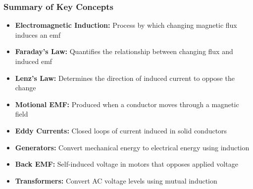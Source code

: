 \documentclass{beamer}
\begin{document}
\begin{frame}
\frametitle{Summary of Key Concepts}
\begin{itemize}
\item \textbf{Electromagnetic Induction:} Process by which changing magnetic flux induces an emf
\item \textbf{Faraday's Law:} Quantifies the relationship between changing flux and induced emf
\item \textbf{Lenz's Law:} Determines the direction of induced current to oppose the change
\item \textbf{Motional EMF:} Produced when a conductor moves through a magnetic field
\item \textbf{Eddy Currents:} Closed loops of current induced in solid conductors
\item \textbf{Generators:} Convert mechanical energy to electrical energy using induction
\item \textbf{Back EMF:} Self-induced voltage in motors that opposes applied voltage
\item \textbf{Transformers:} Convert AC voltage levels using mutual induction
\end{itemize}
\end{frame}
\end{document}
